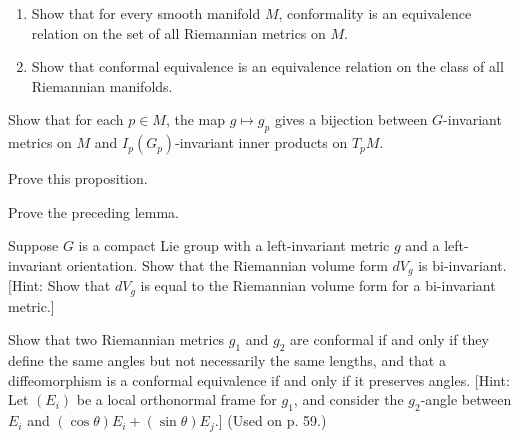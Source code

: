 \begin{exercise}\label{exer:conformality-equivalence-relation}
\begin{enumerate}
\item[(a)] Show that for every smooth manifold $M$, conformality is an equivalence relation on the set of all Riemannian metrics on $M$.
\item[(b)] Show that conformal equivalence is an equivalence relation on the class of all Riemannian manifolds.
\end{enumerate}
\end{exercise}

\begin{exercise}
\label{exer:invariant-metrics-bijection}
Show that for each $p \in M$, the map $g \mapsto g_p$ gives a bijection between $G$-invariant metrics on $M$ and $I_p(G_p)$-invariant inner products on $T_p M$.
\end{exercise}

\begin{exercise}
\label{exer:prove-locally-homogeneous-covering}
Prove this proposition.
\end{exercise}

\begin{exercise}
\label{exer:prove-preceding-lemma}
Prove the preceding lemma.
\end{exercise}

\begin{exercise}
\label{prob:compact-lie-group-volume-form-bi-invariant}
Suppose $G$ is a compact Lie group with a left-invariant metric $g$ and a left-invariant orientation. Show that the Riemannian volume form $dV_g$ is bi-invariant. [Hint: Show that $dV_g$ is equal to the Riemannian volume form for a bi-invariant metric.]
\end{exercise}

\begin{exercise}\label{prob:conformal-metrics}
Show that two Riemannian metrics $g_1$ and $g_2$ are conformal if and only if they define the same angles but not necessarily the same lengths, and that a diffeomorphism is a conformal equivalence if and only if it preserves angles. [Hint: Let $(E_i)$ be a local orthonormal frame for $g_1$, and consider the $g_2$-angle between $E_i$ and $(\cos\theta)E_i + (\sin\theta)E_j$.] (Used on p. 59.)
\end{exercise}

